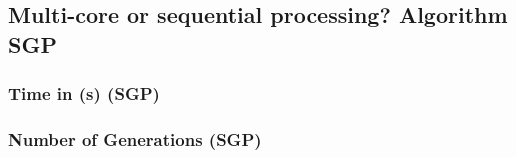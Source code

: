 \documentclass[18pt,c]{beamer}
\begin{document}
\subsection{Multi-core or sequential processing? Algorithm SGP}
 \begin{frame}
 \fontsize{8pt}{9pt}\selectfont
 \frametitle{ Time in (s) (SGP) }

 \label{ExpAStatsTable003.tex}  
 \end{frame}

 \begin{frame}
 \fontsize{8pt}{9pt}\selectfont
 \frametitle{ Number of Generations (SGP) }

 \label{ExpAStatsTable004.tex}  
 \end{frame}
\end{document}
